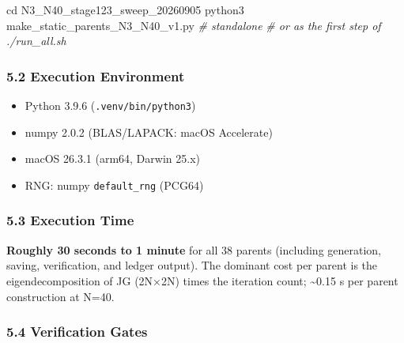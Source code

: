 \documentclass[
  a4paper,
]{ltjsarticle}
\newenvironment{Shaded}{}{}
\newcommand{\BuiltInTok}[1]{\textcolor[rgb]{0.00,0.50,0.00}{#1}}
\newcommand{\CommentTok}[1]{\textcolor[rgb]{0.38,0.63,0.69}{\textit{#1}}}
\newcommand{\ExtensionTok}[1]{#1}
\newcommand{\NormalTok}[1]{#1}
\providecommand{\tightlist}{%
  \setlength{\itemsep}{0pt}\setlength{\parskip}{0pt}}
\begin{document}
\begin{Shaded}
\begin{Highlighting}[]
\BuiltInTok{cd}\NormalTok{ N3\_N40\_stage123\_sweep\_20260905}
\ExtensionTok{python3}\NormalTok{ make\_static\_parents\_N3\_N40\_v1.py      }\CommentTok{\# standalone}
\CommentTok{\# or as the first step of ./run\_all.sh}
\end{Highlighting}
\end{Shaded}

\subsubsection{5.2 Execution Environment}\label{execution-environment}

\begin{itemize}
\tightlist
\item
  Python 3.9.6 (\texttt{.venv/bin/python3})
\item
  numpy 2.0.2 (BLAS/LAPACK: macOS Accelerate)
\item
  macOS 26.3.1 (arm64, Darwin 25.x)
\item
  RNG: numpy \texttt{default\_rng} (PCG64)
\end{itemize}

\subsubsection{5.3 Execution Time}\label{execution-time}

\textbf{Roughly 30 seconds to 1 minute} for all 38 parents (including
generation, saving, verification, and ledger output). The dominant cost
per parent is the eigendecomposition of JG (2N×2N) times the iteration
count; \textasciitilde0.15 s per parent construction at N=40.

\subsubsection{5.4 Verification Gates}\label{verification-gates}
\end{document}
